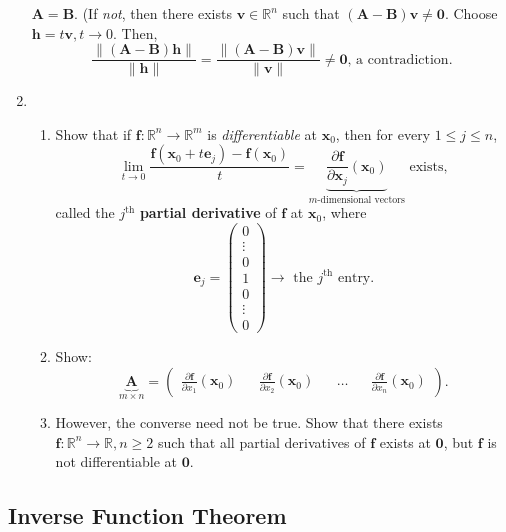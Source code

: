 \documentclass[letterpaper, reqno,11pt]{article}
\newcommand{\RR}{\mathbb{R}}
\begin{document}
\begin{enumerate}
   $\mathbf A = \mathbf B$. (If \emph{not}, then there exists $\mathbf v \in \RR^n$ such that $(\mathbf A - \mathbf B) \mathbf v \neq \mathbf 0$. Choose $\mathbf h = t \mathbf v, t \to 0$. Then,
  \[ \frac{\lVert (\mathbf A - \mathbf B) \mathbf h \rVert}{\lVert \mathbf h \rVert} = \frac{\lVert (\mathbf A - \mathbf B) \mathbf v \rVert}{\lVert \mathbf v \rVert} \neq \mathbf 0 \text{, a contradiction}. \]
\item {}
  \begin{enumerate}
  \item Show that if $\mathbf f : \RR^n \to \RR^m$ is \emph{differentiable} at $\mathbf x_0$, then for every $1 \leq j \leq n$,
    \[ \lim_{t \to 0} \frac{\mathbf f(\mathbf x_0 + t \mathbf e_j) - \mathbf f(\mathbf x_0)}{t} = \underbrace{\frac{\partial \mathbf f}{\partial \mathbf x_j} (\mathbf x_0)}_\text{$m$-dimensional vectors} \text{ exists}, \]
    called the $j^\text{th}$ {\bf partial derivative} of $\mathbf f$ at $\mathbf x_0$, where
    \[ \mathbf e_j =
    \begin{pmatrix}
      0 \\
      \vdots \\
      0 \\
      1 \\
      0 \\
      \vdots \\
      0
    \end{pmatrix}
    \text{$\rightarrow$ the $j^\text{th}$ entry}. \]
  \item Show:
    \[ \underbrace{\mathbf A}_{m \times n} =
    \begin{pmatrix}
      \frac{\partial \mathbf f}{\partial x_1}(\mathbf x_0) && \frac{\partial \mathbf f}{\partial x_2}(\mathbf x_0) && \ldots && \frac{\partial \mathbf f}{\partial x_n}(\mathbf x_0)
    \end{pmatrix}
    . \]
  \item However, the converse need not be true. Show that there exists $\mathbf f : \RR^n \to \RR, n \geq 2$ such that all partial derivatives of $\mathbf f$ exists at $\mathbf 0$, but $\mathbf f$ is not differentiable at $\mathbf 0$.
  \end{enumerate}
\end{enumerate}

\subsection{Inverse Function Theorem}
\end{document}
